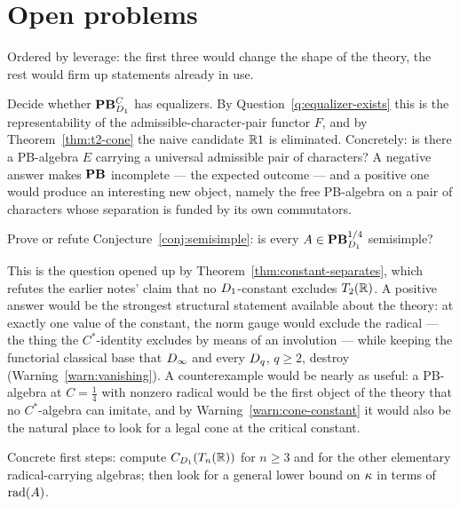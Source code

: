 \section{Open problems}
\label{sec:open}

Ordered by leverage: the first three would change the shape of the theory, the
rest would firm up statements already in use.

\begin{problem}[Completeness]\label{prob:completeness}
Decide whether $\mathbf{PB}^C_{D_1}$ has equalizers.  By
Question~\ref{q:equalizer-exists} this is the representability of the
admissible-character-pair functor $F$, and by Theorem~\ref{thm:t2-cone} the
naive candidate $\mathbb{R}1$ is eliminated.  Concretely: is there a PB-algebra $E$
carrying a universal admissible pair of characters?  A negative answer makes
$\mathbf{PB}$ incomplete --- the expected outcome --- and a positive one would produce
an interesting new object, namely the free PB-algebra on a pair of characters
whose separation is funded by its own commutators.
\end{problem}

\begin{problem}\label{prob:semisimple}
Prove or refute Conjecture~\ref{conj:semisimple}: is every
$A\in\mathbf{PB}^{1/4}_{D_1}$ semisimple?

This is the question opened up by Theorem~\ref{thm:constant-separates}, which
refutes the earlier notes' claim that no $D_1$-constant excludes
$T_2(\mathbb{R})$.  A positive answer would be the strongest structural statement
available about the theory: at exactly one value of the constant, the norm gauge
would exclude the radical --- the thing the $C^*$-identity excludes by means of
an involution --- while keeping the functorial classical base that
$D_\infty$ and every $D_q$, $q\ge2$, destroy
(Warning~\ref{warn:vanishing}).  A counterexample would be nearly as useful: a
PB-algebra at $C=\tfrac14$ with nonzero radical would be the first object of the
theory that no $C^*$-algebra can imitate, and by
Warning~\ref{warn:cone-constant} it would also be the natural place to look for
a legal cone at the critical constant.

Concrete first steps: compute $C_{D_1}(T_n(\mathbb{R}))$ for $n\ge3$ and for the
other elementary radical-carrying algebras; then look for a general lower bound
on $\kappa$ in terms of $\operatorname{rad}(A)$.
\end{problem}

